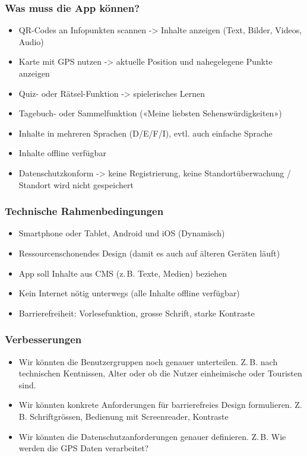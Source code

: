 \documentclass[10pt]{article}
\begin{document}
	\subsubsection[Was]{Was muss die App können?}
	\begin{itemize}
		\item QR-Codes an Infopunkten scannen -> Inhalte anzeigen (Text, Bilder, Videos, Audio)
		\item Karte mit GPS nutzen -> aktuelle Position und nahegelegene Punkte anzeigen
		\item Quiz- oder Rätsel-Funktion -> spielerisches Lernen
		\item Tagebuch- oder Sammelfunktion («Meine liebsten Sehenswürdigkeiten»)
		\item Inhalte in mehreren Sprachen (D/E/F/I), evtl. auch einfache Sprache
		\item Inhalte offline verfügbar
		\item Datenschutzkonform -> keine Registrierung, keine Standortüberwachung / Standort wird nicht gespeichert
	\end{itemize}
	\subsubsection[Womit]{Technische Rahmenbedingungen}
	\begin{itemize}
		\item Smartphone oder Tablet, Android und iOS (Dynamisch)
		\item Ressourcenschonendes Design (damit es auch auf älteren Geräten läuft)
		\item App soll Inhalte aus CMS (z.\,B. Texte, Medien) beziehen
		\item Kein Internet nötig unterwegs (alle Inhalte offline verfügbar)
		\item Barrierefreiheit: Vorlesefunktion, grosse Schrift, starke Kontraste
	\end{itemize}
	\subsubsection[Verbesserungen]{Verbesserungen}
	\begin{itemize}
		\item Wir könnten die Benutzergruppen noch genauer unterteilen. Z.\,B. nach technischen Kentnissen, Alter oder ob die Nutzer einheimische oder Touristen sind.
		\item Wir könnten konkrete Anforderungen für barrierefreies Design formulieren. Z.\,B. Schriftgrössen, Bedienung mit Screenreader, Kontraste
		\item Wir könnten die Datenschutzanforderungen genauer definieren. Z.\,B. Wie werden die GPS Daten verarbeitet?
	\end{itemize}
	\pagebreak
\end{document}
